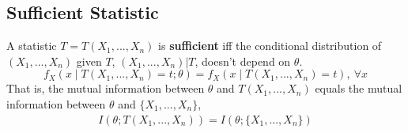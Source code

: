 \documentclass[11pt]{elegantbook}
\begin{document}
\subsection{Sufficient Statistic}
\begin{definition}
    \normalfont
    A statistic $T=T(X_1,...,X_n)$ is \textbf{sufficient} iff the conditional distribution of $(X_1,...,X_n)$ given $T$, $(X_1,...,X_n)|T$, doesn't depend on $\theta$.
    $$f_X(x\mid T(X_1,...,X_n)=t;\theta)=f_X(x\mid T(X_1,...,X_n)=t),\ \forall x$$
    That is, the mutual information between $\theta$ and $T(X_1,...,X_n)$ equals the mutual information between $\theta$ and $\{X_1,...,X_n\}$,
    \begin{equation}
        \begin{aligned}
            I(\theta;T(X_1,...,X_n))=I(\theta;\{X_1,...,X_n\})
        \end{aligned}
        \nonumber
    \end{equation}
\end{definition}
\end{document}
